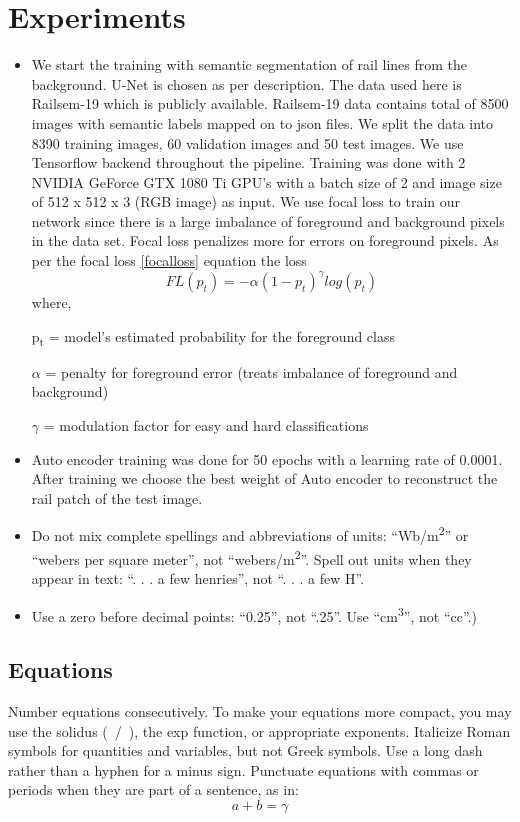\documentclass[conference]{IEEEtran}
\begin{document}
\section{Experiments}
\begin{itemize}
\item We start the training with semantic segmentation of rail lines from the background. U-Net is chosen as per \cite{ronneberger2015unet} description. The data used here is Railsem-19 \cite{9025646}  which is publicly available. Railsem-19 data contains total of 8500 images with semantic labels mapped on to json files. We split the data into 8390 training images, 60 validation images and 50 test images. We use Tensorflow \cite{tensorflow2015-whitepaper} backend throughout the pipeline. Training was done with 2 NVIDIA GeForce GTX 1080 Ti GPU's with a batch size of 2 and image size of 512 x 512 x 3 (RGB image) as input. We use focal loss \cite{lin2018focal} to train our network since there is a large imbalance of foreground and background pixels in the data set. Focal loss penalizes more for errors on foreground pixels. As per the focal loss \ref{focalloss} equation the loss
\begin{equation} 
    FL(p_{t})=-\alpha( 1 - p_{t})^{\gamma}log(p_{t})
\end{equation}\label{focalloss}
 where,
 
 p\textsubscript{t} = model's estimated probability for the foreground class
 
 
 $\alpha$ = penalty for foreground error (treats imbalance of foreground and background)
 
 
 $\gamma$ = modulation factor for easy and hard classifications
 
 
\item Auto encoder training was done for 50 epochs with a learning rate of 0.0001. After training we choose the best weight of Auto encoder to reconstruct the rail patch of the test image.
\item Do not mix complete spellings and abbreviations of units: ``Wb/m\textsuperscript{2}'' or ``webers per square meter'', not ``webers/m\textsuperscript{2}''. Spell out units when they appear in text: ``. . . a few henries'', not ``. . . a few H''.
\item Use a zero before decimal points: ``0.25'', not ``.25''. Use ``cm\textsuperscript{3}'', not ``cc''.)
\end{itemize}

\subsection{Equations}
Number equations consecutively. To make your 
equations more compact, you may use the solidus (~/~), the exp function, or 
appropriate exponents. Italicize Roman symbols for quantities and variables, 
but not Greek symbols. Use a long dash rather than a hyphen for a minus 
sign. Punctuate equations with commas or periods when they are part of a 
sentence, as in:
\begin{equation}
a+b=\gamma\label{eq}
\end{equation}
\end{document}

